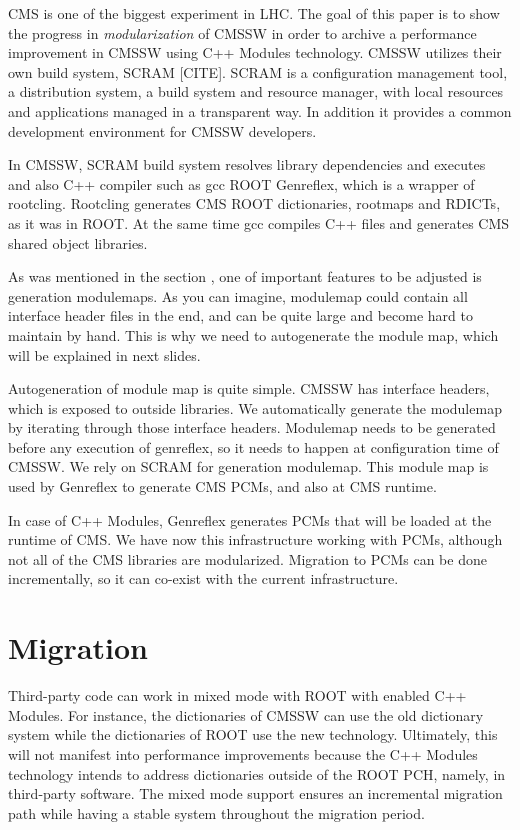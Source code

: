 \documentclass[12pt]{iopart}
\begin{document}
CMS \cite{cms} is one of the biggest experiment in LHC. The goal of this paper is to show the progress in \textit{modularization} of CMSSW in order to archive a performance improvement in CMSSW using C++ Modules technology. CMSSW utilizes their own build system, SCRAM [CITE]. SCRAM is a configuration management tool, a distribution system, a build system and resource manager, with local resources and applications managed in a transparent way. In addition it provides a common development environment for CMSSW developers.

In CMSSW, SCRAM build system resolves library dependencies and executes and also C++ compiler such as gcc ROOT Genreflex, which is a wrapper of rootcling.
Rootcling generates CMS ROOT dictionaries, rootmaps and RDICTs, as it was in ROOT. At the same time gcc compiles C++ files and generates CMS shared object libraries. 

As was mentioned in the section \cite{intro}, one of important features to be adjusted is generation modulemaps. As you can imagine, modulemap could contain all interface header files in the end, and can be quite large and become hard to maintain by hand. This is why we need to autogenerate the module map, which will be explained in next slides.

Autogeneration of module map is quite simple. CMSSW has interface headers, which is exposed to outside libraries. We automatically generate the modulemap by iterating through those interface headers. Modulemap needs to be generated before any execution of genreflex, so it needs to happen at configuration time of CMSSW.
We rely on SCRAM for generation modulemap. This module map is used by Genreflex to generate CMS PCMs, and also at CMS runtime.

In case of C++ Modules, Genreflex generates PCMs that will be loaded at the runtime of CMS. We have now this infrastructure working with PCMs, although not all of the CMS libraries are modularized. Migration to PCMs can be done incrementally, so it can co-exist with the current infrastructure.



\section{Migration}
\label{migration}

Third-party code can work in mixed mode with ROOT with enabled C++ Modules. For instance, the dictionaries of CMSSW can use the old dictionary system while the dictionaries of ROOT use the new technology. Ultimately, this will not manifest into performance improvements because the C++ Modules technology intends to address dictionaries outside of the ROOT PCH, namely, in third-party software. The mixed mode support ensures an incremental migration path while having a stable system throughout the migration period. 
\end{document}
